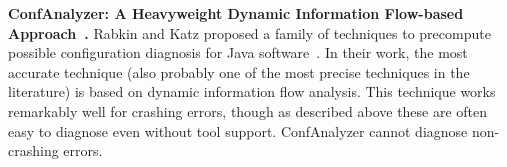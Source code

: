 
\noindent \textbf{ConfAnalyzer: A Heavyweight Dynamic Information Flow-based Approach~\cite{Rabkin:2011:PPC}.}
Rabkin and Katz proposed a family of techniques to precompute possible
configuration diagnosis for Java software~\cite{Rabkin:2011:PPC}. In their work,
the most accurate technique (also probably one of the most precise techniques in the literature)
is based on dynamic information flow analysis.
This technique works remarkably well for crashing errors, though as
described above these are often easy to diagnose even without tool
support.  ConfAnalyzer cannot diagnose non-crashing errors.


